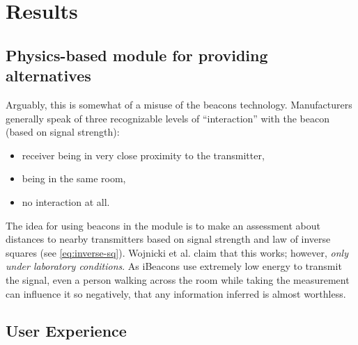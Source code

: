 \chapter{Results}
\label{cha:results}

\section{Physics-based module for providing alternatives}
\label{sec:physics-module}


 Arguably, this is somewhat of a misuse of the beacons technology. Manufacturers generally speak of three recognizable levels of ``interaction'' with the beacon (based on signal strength): \begin{itemize}
 	\item receiver being in very close proximity to the transmitter,
 	\item being in the same room,
 	\item no interaction at all.
 \end{itemize}
 
The idea for using beacons in the module is to make an assessment about distances to nearby transmitters based on signal strength and law of inverse squares (see \cref{eq:inverse-sq}). Wojnicki et al. claim that this works; however, \emph{only under laboratory conditions}.  As iBeacons use extremely low energy to transmit the signal, even a person walking across the room while taking the measurement can influence it so negatively, that any information inferred is almost worthless.


\section{User Experience}
\label{sec:user-experience}
